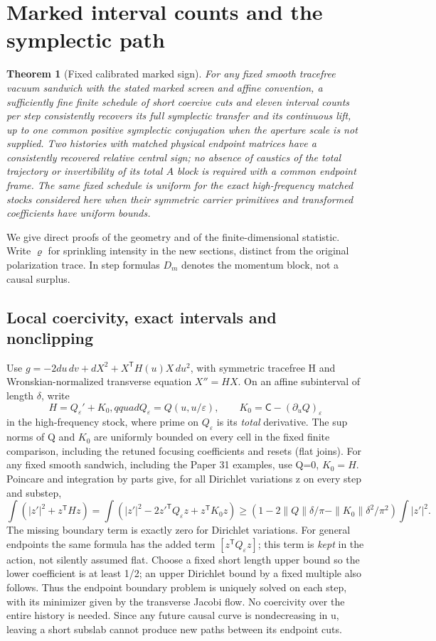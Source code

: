 \documentclass[11pt]{article}
\newtheorem{theorem}{Theorem}
\begin{document}
\section{Marked interval counts and the symplectic path}\label{sec:countgeometry}
\begin{theorem}[Fixed calibrated marked sign]\label{thm:countsign}
For any fixed smooth tracefree vacuum sandwich with the stated marked
screen and affine convention, a sufficiently fine finite schedule of
short coercive cuts and eleven interval counts per step consistently
recovers its full symplectic transfer and its continuous lift, up to
one common positive symplectic conjugation when the aperture scale
is not supplied. Two histories with matched physical endpoint
matrices have a consistently recovered relative central sign; no
absence of caustics of the total trajectory or invertibility of its
total \(A\) block is required with a common endpoint frame. The same
fixed schedule is uniform for the exact high-frequency matched stocks
considered here when their symmetric carrier primitives and
transformed coefficients have uniform bounds.
\end{theorem}
We give direct proofs of the geometry and of the finite-dimensional
statistic. Write \(\varrho\) for sprinkling intensity
in the new sections, distinct from the original polarization trace.
In step formulas
\(D_m\) denotes the momentum block, not a causal surplus.
\subsection{Local coercivity, exact intervals and nonclipping}\label{local-coercivity-exact-intervals-and-nonclipping}

Use \(g=-2du\,dv+dX^2+X^{\mathsf T}H(u)X\,du^2\), with symmetric tracefree H and Wronskian-normalized transverse equation \(X''=HX\). On an affine subinterval of length \(\delta\), write
\[
 H=Q_\varepsilon'+K_0,qquad
 Q_\varepsilon=Q(u,u/\varepsilon),\qquad K_0=\mathsf C-(\partial_u Q)_\varepsilon
\]
in the high-frequency stock, where prime on \(Q_\varepsilon\) is its \emph{total} derivative. The sup norms of Q and \(K_0\) are uniformly bounded on every cell in the fixed finite comparison, including the retuned focusing coefficients and resets (flat joins). For any fixed smooth sandwich, including the Paper 31 examples, use Q=0, \(K_0=H\). Poincare and integration by parts give, for all Dirichlet variations z on every step and substep,
\[
 \int(|z'|^2+z^{\mathsf T}Hz)
 =\int(|z'|^2-2z'^{\mathsf T}Q_\varepsilon z+z^{\mathsf T}K_0z)
 \ge (1-2\|Q\|\delta/\pi-\|K_0\|\delta^2/\pi^2)\int |z'|^2 .
\]
The missing boundary term is exactly zero for Dirichlet variations. For general endpoints the same formula has the added term \([z^{\mathsf T}Q_\varepsilon z]\); this term is \emph{kept} in the action, not silently assumed flat. Choose a fixed short length upper bound so the lower coefficient is at least 1/2; an upper Dirichlet bound by a fixed multiple also follows. Thus the endpoint boundary problem is uniquely solved on each step, with its minimizer given by the transverse Jacobi flow. No coercivity over the entire history is needed. Since any future causal curve is nondecreasing in u, leaving a short subslab cannot produce new paths between its endpoint cuts.
\end{document}
